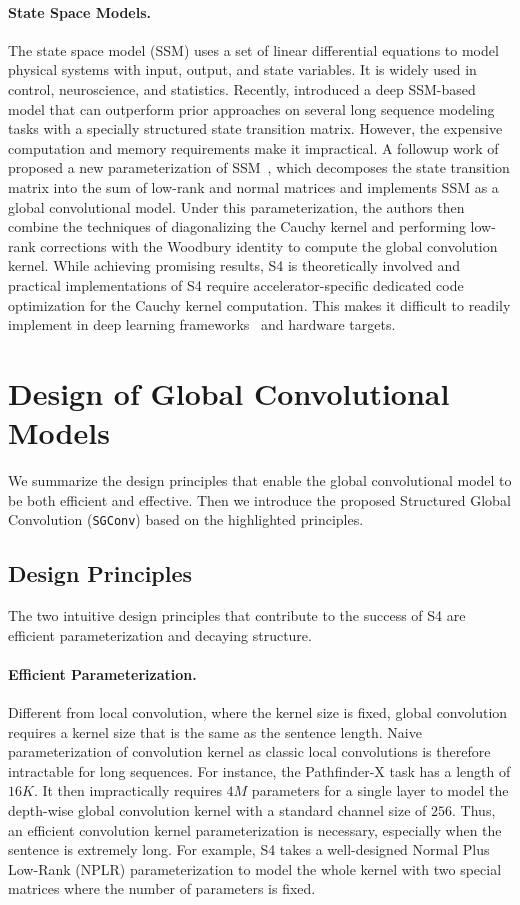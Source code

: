 \paragraph{State Space Models.} The state space model (SSM) uses a set of linear differential equations to model physical systems with input, output, and state variables. It is widely used in control, neuroscience, and statistics. Recently, \citet{gu2021combining} introduced a deep SSM-based model that can outperform prior approaches on several long sequence modeling tasks with a specially structured state transition matrix. However, the expensive computation and memory requirements make it impractical. A followup work of \citet{gu2021combining} proposed a new parameterization of SSM~\citep{gu2021efficiently}, which decomposes the state transition matrix into the sum of low-rank and normal matrices and implements SSM as a global convolutional model. Under this parameterization, the authors then combine the techniques of diagonalizing the Cauchy kernel and performing low-rank corrections with the Woodbury identity to compute the global convolution kernel. While achieving promising results, S4 is theoretically involved and practical implementations of S4 require accelerator-specific dedicated code optimization for the Cauchy kernel computation. This makes it difficult to readily implement in deep learning frameworks~\citep{abadi2016tensorflow,chen2015mxnet,chen2021deep,ma2019paddlepaddle} and hardware targets.

\section{Design of Global Convolutional Models} 

We summarize the design principles that enable the global convolutional model to be both efficient and effective. Then we introduce the proposed Structured Global Convolution (\texttt{SGConv}) based on the highlighted principles.
\subsection{Design Principles} The two intuitive design principles that contribute to the success of S4 are efficient parameterization and decaying structure.
\paragraph{Efficient Parameterization.} Different from local convolution, where the kernel size is fixed, global convolution requires a kernel size that is the same as the sentence length. Naive parameterization of convolution kernel as classic local convolutions is therefore intractable for long sequences. For instance, the Pathfinder-X task has a length of $16K$. It then impractically requires $4M$ parameters for a single layer to model the depth-wise global convolution kernel with a standard channel size of $256$. Thus, an efficient convolution kernel parameterization is necessary, especially when the sentence is extremely long. For example, S4 takes a well-designed Normal Plus Low-Rank (NPLR) parameterization to model the whole kernel with two special matrices where the number of parameters is fixed.
